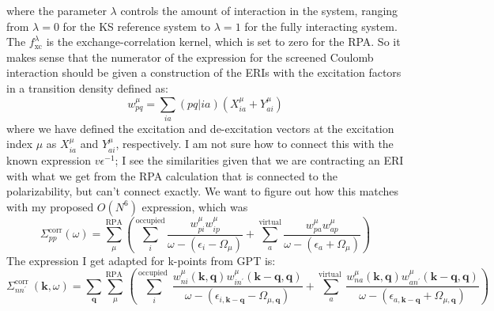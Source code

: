\documentclass[12pt]{article}
\begin{document}
where the parameter $\lambda$ controls the amount of interaction in the system, ranging from $\lambda = 0$ for the KS reference system to $\lambda = 1$ for the fully interacting system. The $f_{\mathrm{xc}}^{\lambda}$ is the exchange-correlation kernel, which is set to zero for the RPA. So it makes sense that the numerator of the expression for the screened Coulomb interaction should be given a construction of the ERIs with the excitation factors in a transition density defined as:
\begin{equation}
    w_{pq}^{\mu} = \sum_{ia} (pq|ia) \left(X_{ia}^{\mu} + Y_{ai}^{\mu}\right)
\end{equation}
where we have defined the excitation and de-excitation vectors at the excitation index $\mu$ as $X_{ia}^{\mu}$ and $Y_{ai}^{\mu}$, respectively.
I am not sure how to connect this with the known expression $v\epsilon ^{-1}$; I see the similarities given that we are contracting an ERI with what we get from the RPA calculation that is connected to the polarizability, but can't connect exactly.
We want to figure out how this matches with my proposed $O(N^6)$ expression, which was
\begin{equation}
    \Sigma_{pp}^{\text{corr}}(\omega) = \sum_{\mu }^{\text{RPA}}\left(\sum_{i}^{\text{occupied}} \frac{w_{pi}^{\mu }w_{ip}^{\mu }}{\omega -(\epsilon _{i}-\Omega  _{\mu })}+ \sum_{a}^{\text{virtual}} \frac{w_{pa}^{\mu }w_{ap}^{\mu }}{\omega -(\epsilon _{a}+\Omega  _{\mu })}\right)
\end{equation}
The expression I get adapted for k-points from GPT is:
\begin{equation}
\Sigma_{n n^\prime}^{\text {corr }}(\mathbf{k}, \omega)=\sum_{\mathbf{q}} \sum_\mu^{\text {RPA }}\left(\sum_i^{\text {occupied }} \frac{w_{n i}^\mu(\mathbf{k}, \mathbf{q}) w_{i n^\prime}^\mu(\mathbf{k}-\mathbf{q}, \mathbf{q})}{\omega-\left(\epsilon_{i, \mathbf{k}-\mathbf{q}}-\Omega_{\mu, \mathbf{q}}\right)}+\sum_a^{\text {virtual }} \frac{w_{n a}^\mu(\mathbf{k}, \mathbf{q}) w_{a n^\prime}^\mu(\mathbf{k}-\mathbf{q}, \mathbf{q})}{\omega-\left(\epsilon_{a, \mathbf{k}-\mathbf{q}}+\Omega_{\mu, \mathbf{q}}\right)}\right)
\end{equation}
\end{document}
